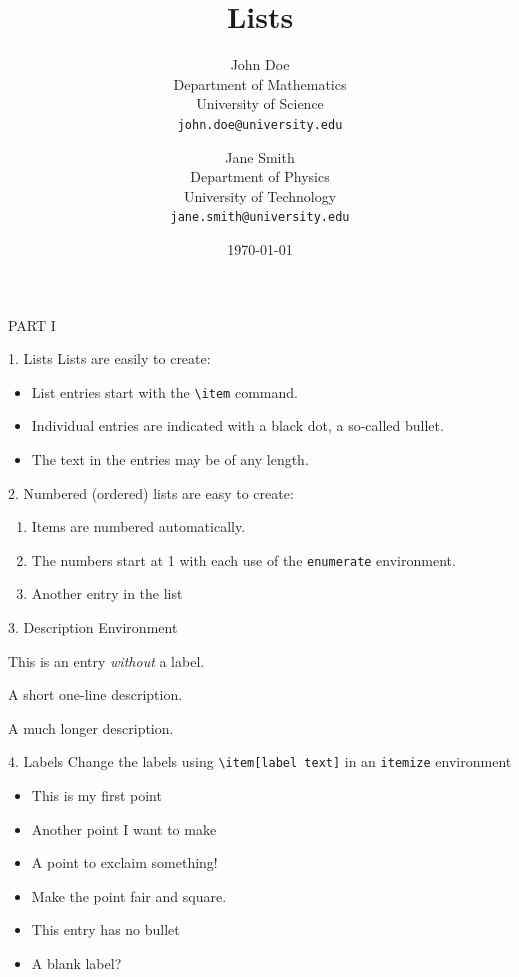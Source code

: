 \documentclass{article}
\title{\Large Lists}
\author{
	John Doe \\
	Department of Mathematics \\
	University of Science \\
	\texttt{john.doe@university.edu}
	\and
	Jane Smith \\
	Department of Physics \\
	University of Technology \\
	\texttt{jane.smith@university.edu}
}
\date{\today}
\begin{document}
	
	\maketitle
	
	PART I
	
	1. Lists
	Lists are easily to create:
	
	\begin{itemize}
		\item List entries start with the \verb|\item| command.
		\item Individual entries are indicated with a black dot, a so-called bullet.
		\item The text in the entries may be of any length.
	\end{itemize}
	
	2. Numbered (ordered) lists are easy to create:
	
	\begin{enumerate}
		\item Items are numbered automatically.
		\item The numbers start at 1 with each use of the \texttt{enumerate} environment.
		\item Another entry in the list
	\end{enumerate}
	
	3. Description Environment
	
	\begin{description}
		\item This is an entry \textit{without} a label.
		\item[Something short] A short one-line description.
		\item[Something long] A much longer description. \blindtext[1]
	\end{description}
	
	4. Labels
	Change the labels using \verb|\item[label text]| in an \texttt{itemize} environment
	
	\begin{itemize}
		\item This is my first point
		\item Another point I want to make 
		\item[!] A point to exclaim something!
		\item[$\blacksquare$] Make the point fair and square.
		\item[NOTE] This entry has no bullet
		\item[] A blank label?
	\end{itemize}
	
\end{document}
